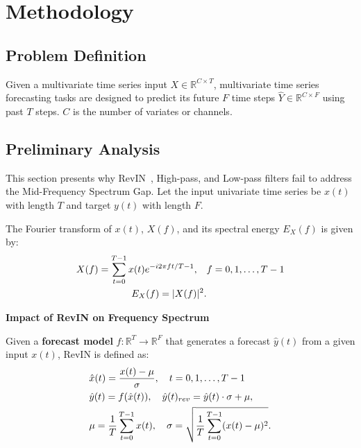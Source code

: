 \section{Methodology}

\subsection{Problem Definition}

Given a multivariate time series input $X \in \mathbb{R}^{C  \times T}$, multivariate time series forecasting tasks are designed to predict its future $F$ time steps $\hat{Y}\in \mathbb{R}^{C \times F}$ using past $T$ steps. $C $ is the number of variates or channels.

\subsection{Preliminary Analysis}

This section presents why RevIN~\citep{Kim_revin,liu2022non}, High-pass, and Low-pass filters fail to address the Mid-Frequency Spectrum Gap. Let the input univariate time series be $ x(t) $ with length $ T $ and target $ y(t) $ with length $ F $. 

\begin{definition}\label{def:energy}
The Fourier transform of $x(t)$, $X(f)$, and its spectral energy $E_X(f)$ is given by:
\vspace{-0.2cm}
\begin{align}
X(f) = \sum_{t=0}^{T-1} x(t) e^{-i 2 \pi f t / {T-1}}, \quad &f = 0, 1, \dots, T-1\notag\\
E_X(f) = |X(f)|^2.
\end{align}
\vspace{-0.2cm}
\end{definition}

\textbf{Impact of RevIN on Frequency Spectrum \quad}
\begin{definition}\label{def:RevIN}
Given a \textbf{forecast model} $ f: \mathbb{R}^T \rightarrow \mathbb{R}^F $ that generates a forecast $ \hat{y}(t) $ from a given input $x(t)$, RevIN is defined as:
\vspace{-0.2cm}
\begin{align}
&\hat{x}(t) = \frac{x(t) - \mu}{\sigma},\quad t = 0, 1, \dots, T-1\notag\\
&\hat{y}(t) = f(\hat{x}(t)), \quad \hat{y}(t)_{rev}= \hat{y}(t) \cdot \sigma + \mu,\notag\\
&\mu = \frac{1}{T} \sum_{t=0}^{T-1} x(t), \quad \sigma = \sqrt{\frac{1}{T} \sum_{t=0}^{T-1} (x(t) - \mu)^2}.
\end{align}
\vspace{-0.2cm}
\end{definition}

